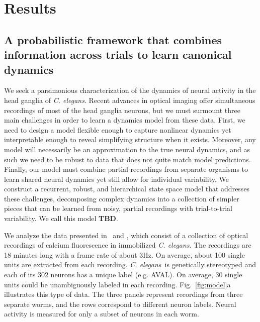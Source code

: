 \documentclass[11pt]{article}
\newcommand{\celegans}{\textit{C. elegans}}
\begin{document}
\clearpage

\section*{Results}

\subsection*{A probabilistic framework that combines information across
  trials to learn canonical dynamics}

We seek a parsimonious characterization of the dynamics of neural
activity in the head ganglia of \celegans. Recent advances in optical
imaging offer simultaneous recordings of most of the head ganglia
neurons, but we must surmount three main challenges in order to learn
a dynamics model from these data.  First, we need to design a model
flexible enough to capture nonlinear dynamics yet interpretable enough
to reveal simplifying structure when it exists.  Moreover, any model
will necessarily be an approximation to the true neural dynamics, and
as such we need to be robust to data that does not quite match model
predictions.  Finally, our model must combine partial recordings from
separate organisms to learn shared neural dynamics yet still allow for
individual variability. We construct a recurrent, robust, and
hierarchical state space model that addresses these challenges,
decomposing complex dynamics into a collection of simpler pieces that
can be learned from noisy, partial recordings with trial-to-trial
variability.  We call this model \textbf{TBD}.

We analyze the data presented in~\citet{kato2015global} and
\citet{nichols2017global}, which consist of a collection of optical
recordings of calcium fluorescence in immobilized \celegans. The
recordings are 18 minutes long with a frame rate of about 3Hz.  On
average, about 100 single units are extracted from each
recording. \celegans~is genetically stereotyped and each of its 302
neurons has a unique label (e.g. \textsf{AVAL}). On average, 30 single
units could be unambiguously labeled in each
recording. Fig.~\ref{fig:model}a illustrates this type of data. The
three panels represent recordings from three separate worms, and the
rows correspond to different neuron labels.  Neural activity is
measured for only a subset of neurons in each worm.
\end{document}
